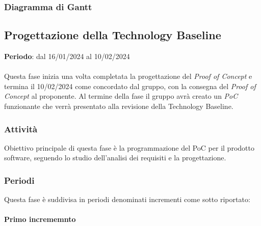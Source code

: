 \newpage 
\subsubsection{Diagramma di Gantt}\label{sec:pianificazione:progRTB:gantt}


\subsection{Progettazione della Technology Baseline}\label{sec:pianificazione:codificaRTB}

\textbf{Periodo}: dal 16/01/2024 al 10/02/2024\\\\
Questa fase inizia una volta completata la progettazione del \textit{Proof of Concept} e termina il 10/02/2024 come concordato dal gruppo, con la consegna del \textit{Proof of Concept} al proponente. Al termine della fase il gruppo avrà creato un \textit{PoC} funzionante che verrà presentato alla revisione della Technology Baseline. 

\subsubsection{Attività}\label{sec:pianificazione:codificaRTB:attivita}
Obiettivo principale di questa fase è la programmazione del PoC per il prodotto software, seguendo lo studio dell'analisi dei requisiti e la progettazione.

\subsubsection{Periodi}\label{sec:pianificazione:codificaRTB:periodi}
Questa fase è suddivisa in periodi denominati incrementi come sotto riportato:

\paragraph{Primo incrememnto}\label{sec:pianificazione:codificaRTB:periodi:primo}

